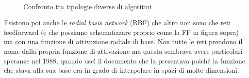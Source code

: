 \begin{figure}[hbtb]
\centering
{} \quad
{} \quad
{}\\
\caption{Confronto tra tipologie diverse di algoritmi}
\label{fig:subfig}
\end{figure}

Esistono poi anche le \textit{radial basis network} (RBF) che altro non sono che reti feedforward (e che possiamo schematizzare proprio come la FF in figura sopra) ma con una funzione di attivazione radiale di base. Non tutte le reti prendono il nome dalla propria funzione di attivazione ma questa sembrava avere particolari speranze nel 1988, quando uscì il documento che la presentava poiché la funzione che stava alla sua base era in grado di interpolare in spazi di molte dimensioni\cite{broomhead1988radial}.
 
